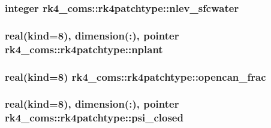 \subsubsection[{nlev\+\_\+sfcwater}]{\setlength{\rightskip}{0pt plus 5cm}integer rk4\+\_\+coms\+::rk4patchtype\+::nlev\+\_\+sfcwater}\label{structrk4__coms_1_1rk4patchtype_adc5144790cd2799dcfaa4e0db370780a}
\hypertarget{structrk4__coms_1_1rk4patchtype_a661699f433b34be7705a6ba92f695bcc}{}
\subsubsection[{nplant}]{\setlength{\rightskip}{0pt plus 5cm}real(kind=8), dimension(\+:), pointer rk4\+\_\+coms\+::rk4patchtype\+::nplant}\label{structrk4__coms_1_1rk4patchtype_a661699f433b34be7705a6ba92f695bcc}
\hypertarget{structrk4__coms_1_1rk4patchtype_a362cb04cdc4cab21706b0987c22b6fce}{}
\subsubsection[{opencan\+\_\+frac}]{\setlength{\rightskip}{0pt plus 5cm}real(kind=8) rk4\+\_\+coms\+::rk4patchtype\+::opencan\+\_\+frac}\label{structrk4__coms_1_1rk4patchtype_a362cb04cdc4cab21706b0987c22b6fce}
\hypertarget{structrk4__coms_1_1rk4patchtype_ad6df5d6c4e2c694d9e6ee406f99b7bb0}{}
\subsubsection[{psi\+\_\+closed}]{\setlength{\rightskip}{0pt plus 5cm}real(kind=8), dimension(\+:), pointer rk4\+\_\+coms\+::rk4patchtype\+::psi\+\_\+closed}\label{structrk4__coms_1_1rk4patchtype_ad6df5d6c4e2c694d9e6ee406f99b7bb0}
\hypertarget{structrk4__coms_1_1rk4patchtype_ac7c8aaf06bdf652c4f7283a3bbb20af9}{}
